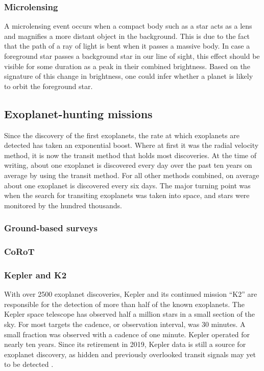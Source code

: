 \subsubsection{Microlensing}
A microlensing event occurs when a compact body such as a star acts as a lens and magnifies a more distant object in the background. This is due to the fact that the path of a ray of light is bent when it passes a massive body. In case a foreground star passes a background star in our line of sight, this effect should be visible for some duration as a peak in their combined brightness. Based on the signature of this change in brightness, one could infer whether a planet is likely to orbit the foreground star.

\subsection{Exoplanet-hunting missions}
Since the discovery of the first exoplanets, the rate at which exoplanets are detected has taken an exponential boost. Where at first it was the radial velocity method, it is now the transit method that holds most discoveries. At the time of writing, about one exoplanet is discovered every day over the past ten years on average by using the transit method. For all other methods combined, on average about one exoplanet is discovered every six days. The major turning point was when the search for transiting exoplanets was taken into space, and stars were monitored by the hundred thousands.

\subsubsection{Ground-based surveys}
\red{[TODO]}
\subsubsection{CoRoT}
\red{[TODO]}
\subsubsection{Kepler and K2}
With over 2500 exoplanet discoveries, Kepler and its continued mission ``K2'' are responsible for the detection of more than half of the known exoplanets. The Kepler space telescope has observed half a million stars in a small section of the sky. For most targets the cadence, or observation interval, was 30 minutes. A small fraction was observed with a cadence of one minute. Kepler operated for nearly ten years. Since its retirement in 2019, Kepler data is still a source for exoplanet discovery, as hidden and previously overlooked transit signals may yet to be detected \citep{hedges2019four}.

